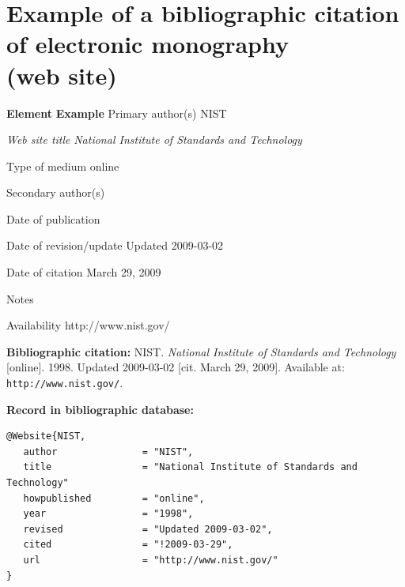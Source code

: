 \newpage
\section*{Example of a bibliographic citation of electronic monography \\
(web site)}
\label{pr-website}
\begin{tabbing}
\zarazky
\textbf{Element} \> \textbf{Example} \odradkovani
Primary author(s) \>
NIST

\odradkovani
{\em Web site title} \>
{\em National Institute of Standards and Technology}

\odradkovani
Type of medium \>
online

\odradkovani
Secondary author(s)\footnotemark[1] \>

\odradkovani
Date of publication 

\odradkovani
Date of revision/update \>
Updated 2009-03-02

\odradkovani
Date of citation \>
March 29, 2009

\odradkovani
Notes\footnotemark[2] \>

\odradkovani
Availability \>
http://www.nist.gov/

\odradkovani
\end{tabbing}

\noindent \textbf{Bibliographic citation:} \odradkovani
NIST. {\em National Institute of Standards and Technology} [online]. 1998. Updated 2009-03-02 [cit. March 29, 2009]. Available at: {\tt http://www.nist.gov/}.

\bigskip \bigskip
\noindent \textbf{Record in bibliographic database:}
\vspace{-0.5em}
\begin{verbatim}
@Website{NIST,
   author               = "NIST",
   title                = "National Institute of Standards and Technology"
   howpublished         = "online",
   year                 = "1998",
   revised              = "Updated 2009-03-02",
   cited                = "!2009-03-29",
   url                  = "http://www.nist.gov/"
}
\end{verbatim}


\newpage
